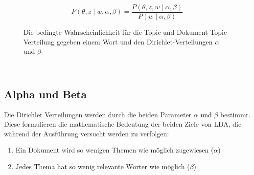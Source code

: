 \documentclass[german,version-2020-11]{uzl-thesis}
\begin{document}
\begin{itemize}
\begin{figure}[h]
\begin{center}
\begin{equation}
P(\theta, z \mid w, \alpha, \beta) = \frac{P(\theta, z, w \mid \alpha, \beta)}{P(w \mid \alpha, \beta)}
\end{equation}
\end{center}
\caption{Die bedingte Wahrscheinlichkeit für die Topic und Dokument-Topic-Verteilung gegeben einem Wort und den Dirichlet-Verteilungen $\alpha$ und $\beta$}
\label{fig:equ2}
\end{figure}\\


\subsection{Alpha und Beta}
Die Dirichlet Verteilungen werden durch die beiden Parameter $\alpha$ und $\beta$ bestimmt. Diese formulieren die mathematische Bedeutung der beiden Ziele von LDA, die während der Ausführung versucht werden zu verfolgen:

\begin{enumerate}
	\item Ein Dokument wird so wenigen Themen wie möglich zugewiesen ($\alpha$)
	\item Jedes Thema hat so wenig relevante Wörter wie möglich ($\beta$)
\end{enumerate}


\end{itemize}
\end{document}
